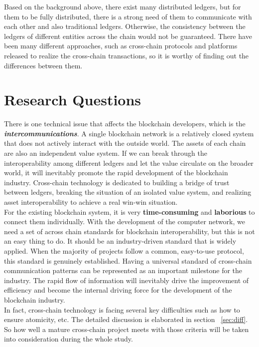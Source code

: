 \noindent Based on the background above, there exist many distributed ledgers, but for them to be fully distributed, there is a strong need of them to communicate with each other and also traditional ledgers. Otherwise, the consistency between the ledgers of different entities across the chain would not be guaranteed. There have been many different approaches, such as cross-chain protocols and platforms released to realize the cross-chain transactions, so it is worthy of finding out the differences between them.

\section{Research Questions}
\label{sec:r}
\noindent There is one technical issue that affects the blockchain developers, which is the \textit{\textbf{intercommunications}}. A single blockchain network is a relatively closed system that does not actively interact with the outside world. The assets of each chain are also an independent value system. If we can break through the interoperability among different ledgers and let the value circulate on the broader world, it will inevitably promote the rapid development of the blockchain industry. Cross-chain technology is dedicated to building a bridge of trust between ledgers, breaking the situation of an isolated value system, and realizing asset interoperability to achieve a real win-win situation.\\

\noindent For the existing blockchain system, it is very \textbf{time-consuming} and \textbf{laborious} to connect them individually. With the development of the computer network, we need a set of across chain standards for blockchain interoperability, but this is not an easy thing to do. It should be an industry-driven standard that is widely applied. When the majority of projects follow a common, easy-to-use protocol, this standard is genuinely established. Having a universal standard of cross-chain communication patterns can be represented as an important milestone for the industry. The rapid flow of information will inevitably drive the improvement of efficiency and become the internal driving force for the development of the blockchain industry.\\


\noindent In fact, cross-chain technology is facing several key difficulties such as how to ensure atomicity, etc. The detailed discussion is elaborated in section ~\ref{sec:diff}. So how well a mature cross-chain project meets with those criteria will be taken into consideration during the whole study.
\\

